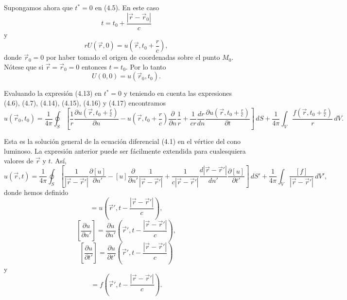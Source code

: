 \documentclass[12pt,a4paper]{book}
\begin{document}
Supongamos ahora que $t^* = 0$ en (4.5). En este caso
\begin{equation}
t = t_0 + \frac{|\vec{r} - \vec{r}_0|}{c}
\end{equation}
y
\begin{equation}
rU(\vec{r}, 0) = u\left(\vec{r}, t_0 + \frac{r}{c}\right),
\end{equation}
donde $\vec{r}_0 = 0$ por haber tomado el origen de coordenadas sobre el punto $M_0$. Nótese que si $\vec{r} = \vec{r}_0 = 0$ entonces $t = t_0$. Por lo tanto
\begin{equation}
U(0, 0) = u(\vec{r}_0, t_0).
\end{equation}

Evaluando la expresión (4.13) en $t^* = 0$ y teniendo en cuenta las expresiones (4.6), (4.7), (4.14), (4.15), (4.16) y (4.17) encontramos
\begin{equation}
u(\vec{r}_0, t_0) = \frac{1}{4\pi}\oint_S \left[\frac{1}{r}\frac{\partial u\left(\vec{r}, t_0 + \frac{r}{c}\right)}{\partial n} - u\left(\vec{r}, t_0 + \frac{r}{c}\right)\frac{\partial}{\partial n}\frac{1}{r} + \frac{1}{cr}\frac{dr}{dn}\frac{\partial u\left(\vec{r}, t_0 + \frac{r}{c}\right)}{\partial t}\right]\,dS + \frac{1}{4\pi}\int_V \frac{f\left(\vec{r}, t_0 + \frac{r}{c}\right)}{r}\,dV.
\end{equation}

Esta es la solución general de la ecuación diferencial (4.1) en el vértice del cono luminoso. La expresión anterior puede ser fácilmente extendida para cualesquiera valores de $\vec{r}$ y $t$. Así,
\begin{equation}
u(\vec{r}, t) = \frac{1}{4\pi}\oint_S \left[\frac{1}{|\vec{r} - \vec{r}'|}\frac{\partial [u]}{\partial n'} - [u]\frac{\partial}{\partial n'}\frac{1}{|\vec{r} - \vec{r}'|} + \frac{1}{c|\vec{r} - \vec{r}'|}\frac{d|\vec{r} - \vec{r}'|}{dn'}\frac{\partial [u]}{\partial t'}\right]\,dS' + \frac{1}{4\pi}\int_V \frac{[f]}{|\vec{r} - \vec{r}'|}\,dV',
\end{equation}
donde hemos definido
\begin{equation}
[u] = u\left(\vec{r}', t - \frac{|\vec{r} - \vec{r}'|}{c}\right),
\end{equation}
\begin{equation}
\left[\frac{\partial u}{\partial n'}\right] = \frac{\partial u}{\partial n'}\left(\vec{r}', t - \frac{|\vec{r} - \vec{r}'|}{c}\right),
\end{equation}
\begin{equation}
\left[\frac{\partial u}{\partial t'}\right] = \frac{\partial u}{\partial t'}\left(\vec{r}', t - \frac{|\vec{r} - \vec{r}'|}{c}\right)
\end{equation}
y
\begin{equation}
[f] = f\left(\vec{r}', t - \frac{|\vec{r} - \vec{r}'|}{c}\right).
\end{equation}
\end{document}
